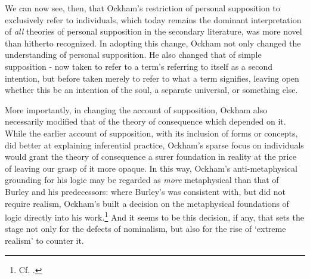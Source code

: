 \documentclass[a4paper, 11pt]{article}
\begin{document}
We can now see, then, that Ockham's restriction of personal supposition to exclusively refer to individuals, which today remains the dominant interpretation of \emph{all} theories of personal supposition in the secondary literature, was more novel than hitherto recognized. In adopting this change, Ockham not only changed the understanding of personal supposition. He also changed that of simple supposition - now taken to refer to a term's referring to itself as a second intention, but before taken merely to refer to what a term signifies, leaving open whether this be an intention of the soul, a separate universal, or something else. 

More importantly, in changing the account of supposition, Ockham also necessarily modified that of the theory of consequence which depended on it. While the earlier account of supposition, with its inclusion of forms or concepts, did better at explaining inferential practice, Ockham's sparse focus on individuals would grant the theory of consequence a surer foundation in reality at the price of leaving our grasp of it more opaque. In this way, Ockham's anti-metaphysical grounding for his logic may be regarded as \emph{more} metaphysical than that of Burley and his predecessors: where Burley's was consistent with, but did not require realism, Ockham's built a decision on the metaphysical foundations of logic directly into his work.\footnote{Cf. \autocite{Read2007}.} And it seems to be this decision, if any, that sets the stage not only for the defects of nominalism, but also for the rise of `extreme realism' to counter it.


\end{document}
